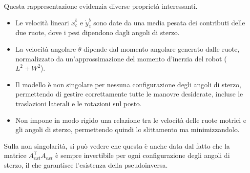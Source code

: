 Questa rappresentazione evidenzia diverse proprietà interessanti.
\begin{itemize}
    \item Le velocità lineari $\dot{x}_c^b$ e $\dot{y}_c^b$ sono date da una media pesata dei contributi delle due ruote, dove i pesi dipendono dagli angoli di sterzo.
    \item La velocità angolare $\dot{\theta}$ dipende dal momento angolare generato dalle ruote, normalizzato da un'approssimazione del momento d'inerzia del robot ($L^2 + W^2$).
    \item Il modello è non singolare per nessuna configurazione degli angoli di sterzo, permettendo di gestire correttamente tutte le manovre desiderate, incluse le traslazioni laterali e le rotazioni sul posto.
    \item Non impone in modo rigido una relazione tra le velocità delle ruote motrici e gli angoli di sterzo, permettendo quindi lo slittamento ma minimizzandolo.
\end{itemize}

\begin{note}
    Sulla non singolarità, si può vedere che questa è anche data dal fatto che la matrice $A_{ext}^\top A_{ext}$ è sempre invertibile per ogni configurazione degli angoli di sterzo, il che garantisce l'esistenza della pseudoinversa.
\end{note}

